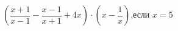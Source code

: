 \begin{ex}[type=simplify_calculate]
	\begin{condition}
		\( \left( \dfrac{x+1}{x-1}-\dfrac{x-1}{x+1}+4x \right)\cdot\left( x-\dfrac{1}{x} \right) \),\quad если \( x=5 \)
	\end{condition}
\end{ex}